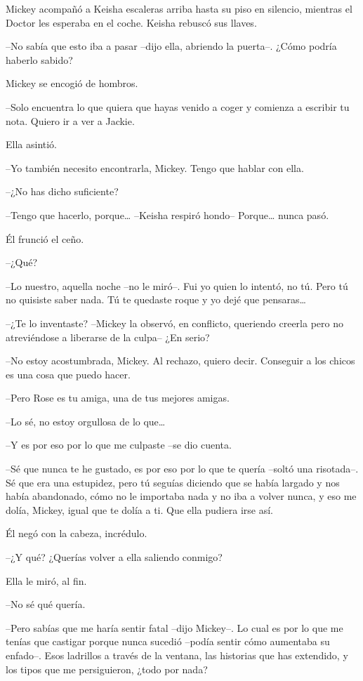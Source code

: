 {Mickey acompañó a Keisha escaleras arriba hasta su piso en silencio,
mientras el Doctor les esperaba en el coche. Keisha rebuscó sus llaves.}

{--No sabía que esto iba a pasar --dijo ella, abriendo la puerta--.
¿Cómo podría haberlo sabido?}

{Mickey se encogió de hombros.}

{--Solo encuentra lo que quiera que hayas venido a coger y comienza a
escribir tu nota. Quiero ir a ver a Jackie.}

{Ella asintió.}

{--Yo también necesito encontrarla, Mickey. Tengo que hablar con ella.}

{--¿No has dicho suficiente?}

{--Tengo que hacerlo, porque\ldots{} --Keisha respiró hondo--
 Porque\ldots{} nunca pasó.}

{Él frunció el ceño.}

{--¿Qué?}

{--Lo nuestro, aquella noche --no le miró--. Fui yo quien lo intentó, no
 tú. Pero tú no quisiste saber nada. Tú te quedaste roque y yo dejé que
 pensaras\ldots{}}

{--¿Te lo inventaste? --Mickey la observó, en conflicto, queriendo
creerla pero no atreviéndose a liberarse de la culpa-- ¿En serio?}

{--No estoy acostumbrada, Mickey. Al rechazo, quiero decir. Conseguir a
los chicos es una cosa que puedo hacer.}

{--Pero Rose es tu amiga, una de tus mejores amigas.}

{--Lo sé, no estoy orgullosa de lo que\ldots{}}

{--Y es por eso por lo que me culpaste --se dio cuenta.}

{--Sé que nunca te he gustado, es por eso por lo que te quería --soltó
 una risotada--. Sé que era una estupidez, pero tú seguías diciendo que
 se había largado y nos había abandonado, cómo no le importaba nada y no
 iba a volver nunca, y eso me dolía, Mickey, igual que te dolía a ti. Que
ella pudiera irse así.}

{Él negó con la cabeza, incrédulo.}

{--¿Y qué? ¿Querías volver a ella saliendo conmigo?}

{Ella le miró, al fin.}

{--No sé qué quería.}

{--Pero sabías que me haría sentir fatal --dijo Mickey--. Lo cual es por
 lo que me tenías que castigar porque nunca sucedió --podía sentir cómo
 aumentaba su enfado--. Esos ladrillos a través de la ventana, las
 historias que has extendido, y los tipos que me persiguieron, ¿todo por
nada?}

